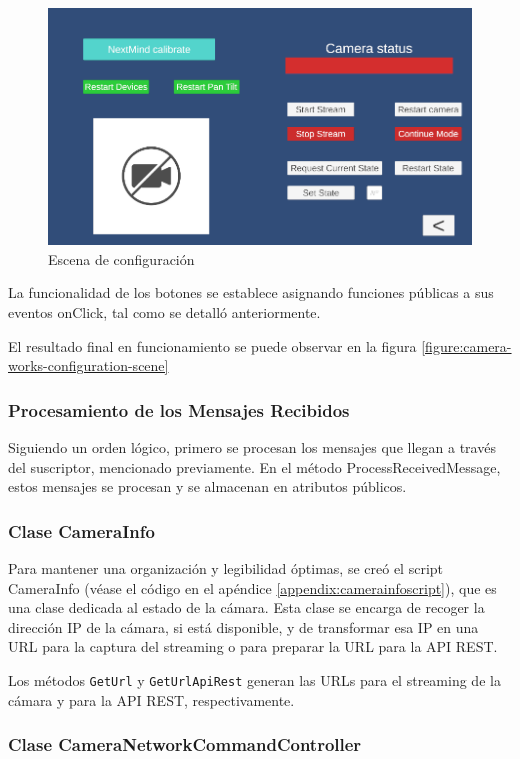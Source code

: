 \begin{figure}[!htb]
\centering
\includegraphics[width=0.8\linewidth]{figures/configuraton-scene.png}
\caption{Escena de configuración}
\label{figure:configuration-scene}
\end{figure}

La funcionalidad de los botones se establece asignando funciones públicas a sus eventos onClick, tal como se detalló anteriormente.

El resultado final en funcionamiento se puede observar en la figura \ref{figure:camera-works-configuration-scene}

\subsubsection{Procesamiento de los Mensajes Recibidos}

Siguiendo un orden lógico, primero se procesan los mensajes que llegan a través del suscriptor, mencionado previamente. En el método ProcessReceivedMessage, estos mensajes se procesan y se almacenan en atributos públicos.

\subsubsection{Clase CameraInfo}

Para mantener una organización y legibilidad óptimas, se creó el script CameraInfo (véase el código en el apéndice \ref{appendix:camerainfoscript}), que es una clase dedicada al estado de la cámara. Esta clase se encarga de recoger la dirección IP de la cámara, si está disponible, y de transformar esa IP en una URL para la captura del streaming o para preparar la URL para la API REST.

Los métodos \lstinline{GetUrl} y \lstinline{GetUrlApiRest} generan las URLs para el streaming de la cámara y para la API REST, respectivamente.

\subsubsection{Clase CameraNetworkCommandController}

